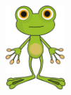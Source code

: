 \documentclass[12pt]{exam}
\begin{document}
\begin{figure}[t]
	\begin{center}
		\includegraphics[width=0.2\textwidth]{Figures/2_frog.png}
	\end{center}
\end{figure}
\end{document}
